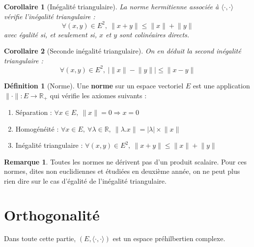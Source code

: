 \documentclass[french]{article}
\newcommand{\R}{\mathbb{R}}
\theoremstyle{plain}
\newtheorem{cor}{Corollaire}
\theoremstyle{definition}
\newtheorem{dfn}{Définition}
\newtheorem{rmq}{Remarque}
\begin{document}
\begin{cor}[Inégalité triangulaire]
	La norme hermitienne associée à $\langle\cdot,\cdot\rangle$ vérifie l'inégalité triangulaire : $$\forall (x,y)\in E^2,\ \lVert x+y\rVert\leqslant\lVert x\rVert+\lVert y\rVert$$ avec égalité si, et seulement si, $x$ et $y$ sont colinéaires directs. 
\end{cor}
\begin{cor}[Seconde inégalité triangulaire]
	On en déduit la second inégalité triangulaire : $$\forall (x,y)\in E^2,\ \big|\lVert x\rVert - \lVert y\rVert\big| \leqslant \lVert x-y\rVert$$
\end{cor}
\begin{dfn}[Norme]
	Une \textbf{norme} sur un espace vectoriel $E$ est une application $\lVert\cdot\rVert:E\rightarrow\R_+$ qui vérifie les axiomes suivants :
	\begin{enumerate}
		\item Séparation : $\forall x\in E,\ \lVert x\rVert=0 \Rightarrow x=0$
		\item Homogénéité : $\forall x\in E,\  \forall \lambda\in\R,\ \lVert \lambda.x\rVert=\lvert\lambda\rvert\times\lVert x\rVert$
		\item Inégalité triangulaire : $\forall (x,y)\in E^2,\ \lVert x+y\rVert\leqslant\lVert x\rVert+\lVert y\rVert$
	\end{enumerate}
\end{dfn}
\begin{rmq} Toutes les normes ne dérivent pas d'un produit scalaire. Pour ces normes, dites non euclidiennes et étudiées en deuxième année, on ne peut plus rien dire sur le cas d'égalité de l'inégalité triangulaire. \end{rmq}

\section{Orthogonalité}
Dans toute cette partie, $(E,\langle\cdot,\cdot\rangle)$ est un espace préhilbertien complexe.
\end{document}
